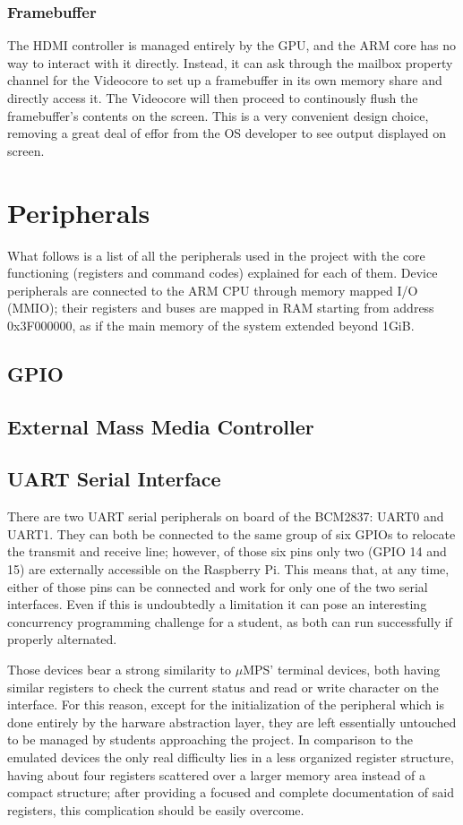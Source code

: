 \documentclass[12pt,a4paper,openright,twoside]{report}
\begin{document}
\subsubsection{Framebuffer}
The HDMI controller is managed entirely by the GPU, and the ARM core has no 
way to interact with it directly. Instead, it can ask through the mailbox
property channel for the Videocore to set up a framebuffer in its own memory
share and directly access it. The Videocore will then proceed to continously flush the
framebuffer's contents on the screen.
This is a very convenient design choice, removing a great deal of effor from
the OS developer to see output displayed on screen.


\section{Peripherals}
What follows is a list of all the peripherals used in the project with the core
functioning (registers and command codes) explained for each of them.
Device peripherals are connected to the ARM CPU through memory mapped I/O (MMIO);
their registers and buses are mapped in RAM starting from address 0x3F000000,
as if the main memory of the system extended beyond 1GiB.

\subsection{GPIO}

\subsection{External Mass Media Controller}

\subsection{UART Serial Interface}
There are two UART serial peripherals on board of the BCM2837: UART0 and UART1.
They can both be connected to the same group of six GPIOs to relocate the 
transmit and receive line; however, of those six pins only two (GPIO 14 and 15)
are externally accessible on the Raspberry Pi. This means that, at any time,
either of those pins can be connected and work for only one of the two serial
interfaces.
Even if this is undoubtedly a limitation it can pose an interesting
concurrency programming challenge for a student, as both can run successfully if 
properly alternated.

Those devices bear a strong similarity to $\mu$MPS' terminal devices, both having 
similar registers to check the current status and read or write character on the
interface. For this reason, except for the initialization of the peripheral
which is done entirely by the harware abstraction layer, they are left essentially
 untouched to be managed by students approaching the project. In comparison to 
 the emulated devices the only real difficulty lies in a less organized register
 structure, having about four registers scattered over a larger memory area instead
 of a compact structure; after providing a focused and complete documentation of 
 said registers, this complication should be easily overcome.
\end{document}
